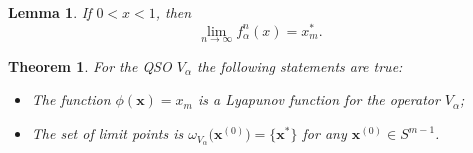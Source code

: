 \documentclass[10pt,a4paper]{amsart}
\newtheorem{lemma}{Lemma}
\newtheorem{theorem}{Theorem}
\begin{document}
\begin{lemma}\label{falfa} If $0<x<1$, then
\[\lim\limits_{n\rightarrow\infty} f^n_\alpha(x)=x_m^*.\]
\end{lemma}

\begin{theorem} For the QSO $V_\alpha$ the following statements are true:
\begin{itemize}
\item[i)] The function $\phi(\mathbf{x}) =x_m$ is a Lyapunov function for the operator $V_\alpha$;
\item[ii)] The set of limit points is $\omega_{V_\alpha}\big(\mathbf{x}^{(0)}\big)=\{\mathbf{x}^*\}$ for any $\mathbf{x}^{(0)}\in S^{m-1}$.
\end{itemize}
\end{theorem}
\end{document}
